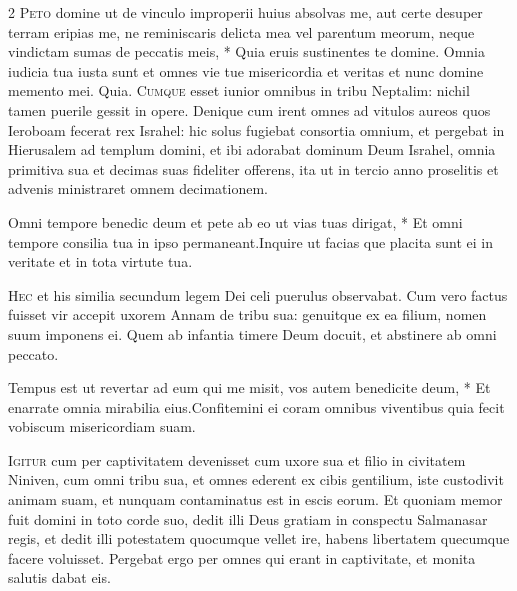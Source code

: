 \begin{multicols*}{2}
\lettrine[lines=2]{\zallmancaps \color{Blue} P}{eto} \hypertarget{peto-domine}{\label{peto-domine}} domine ut de vinculo improperii huius absolvas me, aut certe desuper terram eripias me, ne reminiscaris delicta mea vel parentum meorum, neque vindictam sumas de peccatis meis, * Quia eruis sustinentes te domine. \V Omnia iudicia tua iusta sunt et omnes vie tue misericordia et veritas et nunc domine memento mei. Quia.
\lettrine[lines=2]{\zallmancaps \color{Red} C}{umque} esset iunior omnibus in tribu Neptalim: nichil tamen puerile gessit in opere. Denique cum irent omnes ad vitulos aureos quos Ieroboam fecerat rex Israhel: hic solus fugiebat consortia omnium, et pergebat in Hierusalem ad templum domini, et ibi adorabat dominum Deum Israhel, omnia primitiva sua et decimas suas fideliter offerens, ita ut in tercio anno proselitis et advenis ministraret omnem decimationem.
\begin{responsory}
{Omni tempore benedic deum et pete ab eo ut vias tuas dirigat, * Et omni tempore consilia tua in ipso permaneant.}{Inquire ut facias que placita sunt ei in veritate et in tota virtute tua.}
\end{responsory}%
\lettrine[lines=2]{\zallmancaps \color{Blue} H}{ec} et his similia secundum legem Dei celi puerulus observabat. Cum vero factus fuisset vir accepit uxorem Annam de tribu sua: genuitque ex ea filium, nomen suum imponens ei. Quem ab infantia timere Deum docuit, et abstinere ab omni peccato.
\begin{responsory-doxology}
{Tempus est ut revertar ad eum qui me misit, vos autem benedicite deum, * Et enarrate omnia mirabilia eius.}{Confitemini ei coram omnibus viventibus quia fecit vobiscum misericordiam suam.}
\end{responsory-doxology}%
\lettrine[lines=2]{\zallmancaps \color{Red} I}{gitur} cum per captivitatem devenisset cum uxore sua et filio in civitatem Niniven, cum omni tribu sua, et omnes ederent ex cibis gentilium, iste custodivit animam suam, et nunquam contaminatus est in escis eorum. Et quoniam memor fuit domini in toto corde suo, dedit illi Deus gratiam in conspectu Salmanasar regis, et dedit illi potestatem quocumque vellet ire, habens libertatem quecumque facere voluisset. Pergebat ergo per omnes qui erant in captivitate, et monita salutis dabat eis.

\end{multicols*}
